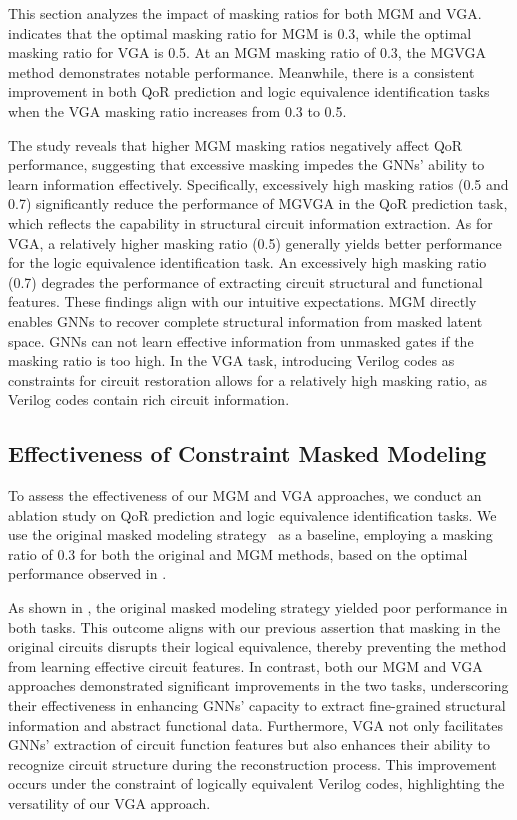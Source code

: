 This section analyzes the impact of masking ratios for both MGM and VGA. 
 indicates that the optimal masking ratio for MGM is 0.3, while the optimal masking ratio for VGA is 0.5.
At an MGM masking ratio of 0.3, the MGVGA method demonstrates notable performance. 
Meanwhile, there is a consistent improvement in both QoR prediction and logic equivalence identification tasks when the VGA masking ratio increases from 0.3 to 0.5.

The study reveals that higher MGM masking ratios negatively affect QoR performance, suggesting that excessive masking impedes the GNNs' ability to learn information effectively. 
Specifically, excessively high masking ratios (0.5 and 0.7) significantly reduce the performance of MGVGA in the QoR prediction task, which reflects the capability in structural circuit information extraction.
As for VGA, a relatively higher masking ratio (0.5) generally yields better performance for the logic equivalence identification task. 
An excessively high masking ratio (0.7) degrades the performance of extracting circuit structural and functional features.
These findings align with our intuitive expectations.
MGM directly enables GNNs to recover complete structural information from masked latent space. 
GNNs can not learn effective information from unmasked gates if the masking ratio is too high. 
In the VGA task, introducing Verilog codes as constraints for circuit restoration allows for a relatively high masking ratio, as Verilog codes contain rich circuit information.


\subsection{Effectiveness of Constraint Masked Modeling}

To assess the effectiveness of our MGM and VGA approaches, we conduct an ablation study on QoR prediction and logic equivalence identification tasks. 
We use the original masked modeling strategy~\citep{hou2023graphmae2} as a baseline, employing a masking ratio of 0.3 for both the original and MGM methods, based on the optimal performance observed in .

As shown in , the original masked modeling strategy yielded poor performance in both tasks. 
This outcome aligns with our previous assertion that masking in the original circuits disrupts their logical equivalence, thereby preventing the method from learning effective circuit features.
In contrast, both our MGM and VGA approaches demonstrated significant improvements in the two tasks, underscoring their effectiveness in enhancing GNNs' capacity to extract fine-grained structural information and abstract functional data.
Furthermore, VGA not only facilitates GNNs' extraction of circuit function features but also enhances their ability to recognize circuit structure during the reconstruction process. This improvement occurs under the constraint of logically equivalent Verilog codes, highlighting the versatility of our VGA approach.

